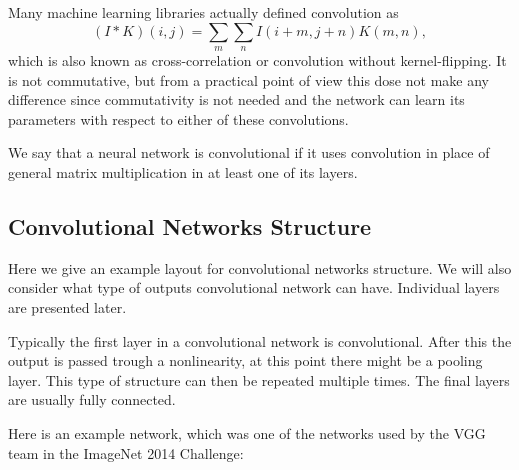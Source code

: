 \documentclass[]{article}
\begin{document}
Many machine learning libraries actually defined convolution as
\[
(I * K)(i, j) = \sum_m \sum_n I(i + m , j + n) K(m, n),
\]
which is also known as cross-correlation or convolution without kernel-flipping.
It is not commutative, but from a practical point of view this dose not make any difference
since commutativity is not needed and the network can learn its parameters with
respect to either of these convolutions.

We say that a neural network is convolutional if it uses convolution in place of
general matrix multiplication in at least one of its layers.

\subsection{Convolutional Networks Structure}
Here we give an example layout for convolutional networks structure. We will also
consider what type of outputs convolutional network can have. Individual layers are
presented later.

Typically the first layer in a convolutional network is convolutional. After this
the output is passed trough a nonlinearity, at this point there might be a pooling
layer. This type of structure can then be repeated multiple times. The final layers
are usually fully connected.

Here is an example network, which was one of the networks used by the VGG team
in the ImageNet 2014 Challenge:
\end{document}
